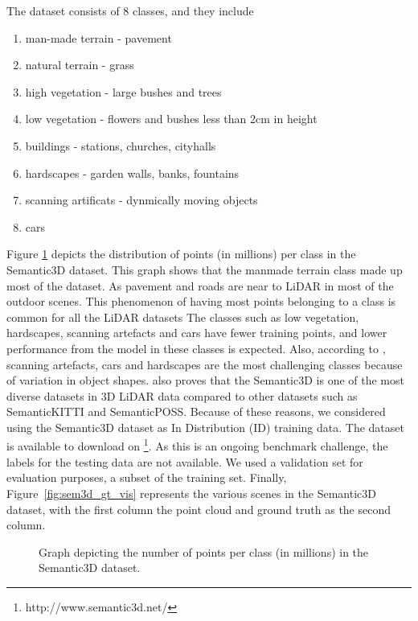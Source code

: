     The dataset consists of 8 classes, and they include
\begin{enumerate}
    \item man-made terrain - pavement
    \item natural terrain - grass
    \item high vegetation - large bushes and trees
    \item low vegetation - flowers and bushes less than 2cm in height
    \item buildings - stations, churches, cityhalls
    \item hardscapes - garden walls, banks, fountains
    \item scanning artificats - dynmically moving objects
    \item cars
\end{enumerate}
Figure \ref{fig:sem3ddist} depicts the distribution of points (in millions) per class in the Semantic3D dataset.
This graph shows that the manmade terrain class made up most of the dataset.
As pavement and roads are near to LiDAR in most of the outdoor scenes.
This phenomenon of having most points belonging to a class is common for all the LiDAR datasets 
The classes such as low vegetation, hardscapes, scanning artefacts and cars have fewer training points, and lower performance from the model in these classes is expected.
Also, according to \cite{hackel2017semantic3d}, scanning artefacts, cars and hardscapes are the most challenging classes because of variation in object shapes.
\cite{survey3d} also proves that the Semantic3D is one of the most diverse datasets in 3D LiDAR data compared to other datasets such as SemanticKITTI and SemanticPOSS.
Because of these reasons, we considered using the Semantic3D dataset as In Distribution (ID) training data.
The dataset is available to download on \footnote[1]{http://www.semantic3d.net/}. 
As this is an ongoing benchmark challenge, the labels for the testing data are not available.
We used a validation set for evaluation purposes, a subset of the training set.
Finally, Figure~\ref{fig:sem3d_gt_vis} represents the various scenes in the Semantic3D dataset, with the first column the point cloud and ground truth as the second column.
\begin{figure}[h!]
    \centering
    
    \caption{Graph depicting the number of points per class (in millions) in the Semantic3D dataset.}
    \label{fig:sem3ddist}
\end{figure}


